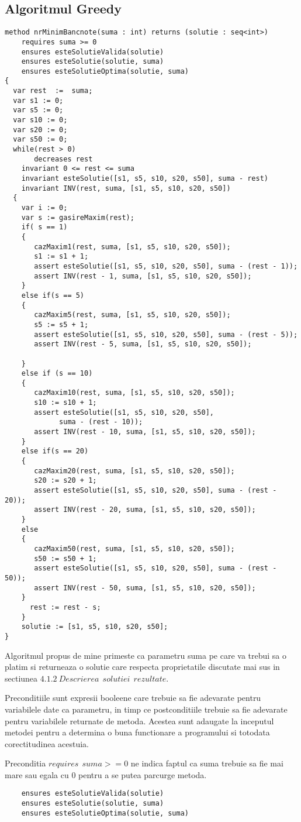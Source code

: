 \subsection{Algoritmul Greedy}
\begin{lstlisting}
method nrMinimBancnote(suma : int) returns (solutie : seq<int>)
	requires suma >= 0
	ensures esteSolutieValida(solutie)
	ensures esteSolutie(solutie, suma)
	ensures esteSolutieOptima(solutie, suma)
{
  var rest  :=  suma;
  var s1 := 0;
  var s5 := 0;
  var s10 := 0;
  var s20 := 0;
  var s50 := 0;
  while(rest > 0)
  	   decreases rest
   	invariant 0 <= rest <= suma
   	invariant esteSolutie([s1, s5, s10, s20, s50], suma - rest)
   	invariant INV(rest, suma, [s1, s5, s10, s20, s50])
  {
 	var i := 0;
	var s := gasireMaxim(rest);
	if( s == 1)
	{
	   cazMaxim1(rest, suma, [s1, s5, s10, s20, s50]);
	   s1 := s1 + 1;
	   assert esteSolutie([s1, s5, s10, s20, s50], suma - (rest - 1));
	   assert INV(rest - 1, suma, [s1, s5, s10, s20, s50]);
	}
	else if(s == 5)
	{
	   cazMaxim5(rest, suma, [s1, s5, s10, s20, s50]);
	   s5 := s5 + 1;
	   assert esteSolutie([s1, s5, s10, s20, s50], suma - (rest - 5));
	   assert INV(rest - 5, suma, [s1, s5, s10, s20, s50]);
			
	}
	else if (s == 10)
	{
	   cazMaxim10(rest, suma, [s1, s5, s10, s20, s50]);
	   s10 := s10 + 1;
	   assert esteSolutie([s1, s5, s10, s20, s50],
	   		 suma - (rest - 10));
	   assert INV(rest - 10, suma, [s1, s5, s10, s20, s50]);	
	}
	else if(s == 20)
	{
	   cazMaxim20(rest, suma, [s1, s5, s10, s20, s50]);
	   s20 := s20 + 1;
	   assert esteSolutie([s1, s5, s10, s20, s50], suma - (rest - 20));
       assert INV(rest - 20, suma, [s1, s5, s10, s20, s50]);
	}
	else
	{
	   cazMaxim50(rest, suma, [s1, s5, s10, s20, s50]);
	   s50 := s50 + 1;
	   assert esteSolutie([s1, s5, s10, s20, s50], suma - (rest - 50));
	   assert INV(rest - 50, suma, [s1, s5, s10, s20, s50]);
	}
	  rest := rest - s;
	}
	solutie := [s1, s5, s10, s20, s50];
}
\end{lstlisting}
\par 
Algoritmul propus de mine primeste ca parametru suma pe care va trebui sa o platim si returneaza o solutie care respecta proprietatile discutate mai sus in sectiunea $4.1.2 \ Descrierea \ \ solutiei \ \ rezultate $.
\par 
Preconditiile sunt expresii booleene care trebuie sa fie adevarate pentru variabilele date ca parametru, in timp ce postconditiile trebuie sa fie adevarate pentru variabilele returnate de metoda. Acestea sunt adaugate la inceputul metodei pentru a determina o buna functionare a programului si totodata corectitudinea acestuia.
\par 
Preconditia $requires \ \ suma >= 0$ ne indica faptul ca suma trebuie sa fie mai mare sau egala cu 0 pentru a se putea parcurge metoda.\par 
\vspace{0.5cm}
\begin{lstlisting}
	ensures esteSolutieValida(solutie) 
	ensures esteSolutie(solutie, suma)
	ensures esteSolutieOptima(solutie, suma)
\end{lstlisting}
 		

